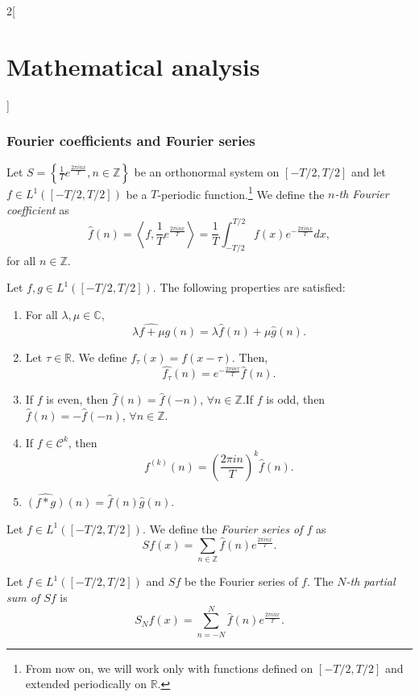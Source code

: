 \documentclass[class=article,crop=false]{standalone}
\begin{document}
\begin{multicols}{2}[\section{Mathematical analysis}]
\subsubsection{Fourier coefficients and Fourier series}
\begin{definition}
Let $\displaystyle S=\left\{\frac{1}{T}e^{\frac{2\pi inx}{T}},n\in\mathbb{Z}\right\}$ be an orthonormal system on $[-T/2,T/2]$ and let $f\in L^1([-T/2,T/2])$ be a $T$-periodic function.\footnote{From now on, we will work only with functions defined on $[-T/2,T/2]$ and extended periodically on $\mathbb{R}$.} We define the \textit{$n$-th Fourier coefficient} as $$\widehat{f}(n)=\left\langle f,\frac{1}{T}e^{\frac{2\pi inx}{T}}\right\rangle=\frac{1}{T}\int_{-T/2}^{T/2}f(x)e^{-\frac{2\pi inx}{T}}dx,$$ for all $n\in\mathbb{Z}$.
\end{definition}
\begin{prop}
Let $f,g\in L^1([-T/2,T/2])$. The following properties are satisfied:
\begin{enumerate}
    \item For all $\lambda,\mu\in\mathbb{C}$, $$\widehat{\lambda f+\mu g}(n)=\lambda\widehat{f}(n)+\mu\widehat{g}(n).$$
    \item Let $\tau\in\mathbb{R}$. We define $f_\tau(x)=f(x-\tau)$. Then, $$\widehat{f_\tau}(n)=e^{-\frac{2\pi in\tau}{T}}\widehat{f}(n).$$
    \item If $f$ is even, then $\widehat{f}(n)=\widehat{f}(-n)$, $\forall n\in\mathbb{Z}$.\newline If $f$ is odd, then $\widehat{f}(n)=-\widehat{f}(-n)$, $\forall n\in\mathbb{Z}$. 
    \item If $f\in \mathcal{C}^k$, then $$\widehat{f^{(k)}}(n)=\left(\frac{2\pi in}{T}\right)^k\widehat{f}(n).$$
    \item $\widehat{(f*g)}(n)=\widehat{f}(n)\widehat{g}(n)$.
\end{enumerate}
\end{prop}
\begin{definition}
Let $f\in L^1([-T/2,T/2])$. We define the \textit{Fourier series of $f$} as $$\displaystyle Sf(x)=\sum_{n\in\mathbb{Z}}\widehat{f}(n)e^{\frac{2\pi inx}{T}}.$$
\end{definition}
\begin{definition}
Let $f\in L^1([-T/2,T/2])$ and $Sf$ be the Fourier series of $f$. The \textit{$N$-th partial sum of $Sf$} is $$S_Nf(x)=\sum_{n=-N}^N\widehat{f}(n)e^{\frac{2\pi inx}{T}}.$$
\end{definition}
\begin{prop}

\end{prop}
\end{multicols}
\end{document}
